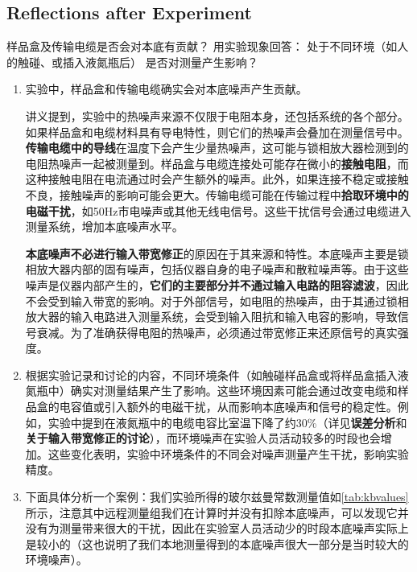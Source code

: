 \subsection{Reflections after Experiment}
\begin{question}
	样品盒及传输电缆是否会对本底有贡献？ 用实验现象回答： 处于不同环境（如人的触碰、或插入液氮瓶后） 是否对测量产生影响？
\end{question}
\begin{enumerate}
	\item 实验中，样品盒和传输电缆确实会对本底噪声产生贡献。
	
	讲义提到，实验中的热噪声来源不仅限于电阻本身，还包括系统的各个部分。如果样品盒和电缆材料具有导电特性，则它们的热噪声会叠加在测量信号中。\textbf{传输电缆中的导线}在温度下会产生少量热噪声，这可能与锁相放大器检测到的电阻热噪声一起被测量到。样品盒与电缆连接处可能存在微小的\textbf{接触电阻}，而这种接触电阻在电流通过时会产生额外的噪声。此外，如果连接不稳定或接触不良，接触噪声的影响可能会更大。传输电缆可能在传输过程中\textbf{拾取环境中的电磁干扰}，如50Hz市电噪声或其他无线电信号。这些干扰信号会通过电缆进入测量系统，增加本底噪声水平。
	
	\textbf{本底噪声不必进行输入带宽修正}的原因在于其来源和特性。本底噪声主要是锁相放大器内部的固有噪声，包括仪器自身的电子噪声和散粒噪声等。由于这些噪声是仪器内部产生的，\textbf{它们的主要部分并不通过输入电路的阻容滤波}，因此不会受到输入带宽的影响。对于外部信号，如电阻的热噪声，由于其通过锁相放大器的输入电路进入测量系统，会受到输入阻抗和输入电容的影响，导致信号衰减。为了准确获得电阻的热噪声，必须通过带宽修正来还原信号的真实强度。
	
	\item 根据实验记录和讨论的内容​，不同环境条件（如触碰样品盒或将样品盒插入液氮瓶中）确实对测量结果产生了影响。这些环境因素可能会通过改变电缆和样品盒的电容值或引入额外的电磁干扰，从而影响本底噪声和信号的稳定性。例如，实验中提到在液氮瓶中的电缆电容比室温下降了约30\%（详见\textbf{误差分析}和\textbf{关于输入带宽修正的讨论}），而环境噪声在实验人员活动较多的时段也会增加。这些变化表明，实验中环境条件的不同会对噪声测量产生干扰，影响实验精度。
	
	\item 下面具体分析一个案例：我们实验所得的玻尔兹曼常数测量值如\cref{tab:kbvalues}所示，注意其中远程测量组我们在计算时并没有扣除本底噪声，可以发现它并没有为测量带来很大的干扰，因此在实验室人员活动少的时段本底噪声实际上是较小的（这也说明了我们本地测量得到的本底噪声很大一部分是当时较大的环境噪声）。
	
\end{enumerate}

